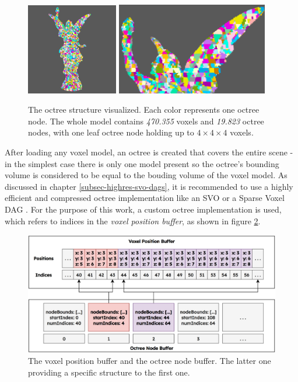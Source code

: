 \begin{figure}[h]
    \centering
    \includegraphics[width=151.5px]{images/graphics/lucy-voxel-octree-viz.jpg}
    \includegraphics[width=250px]{images/graphics/lucy-voxel-octree-viz-2.jpg}
    \caption{The octree structure visualized. Each color represents one octree node. The whole model contains 
    \emph{470.355} voxels and \emph{19.823} octree nodes, with one leaf octree node holding up to \begin{math} 4 \times 4 \times 4 \end{math}
    voxels.}
    \label{fig:voxel-octree-viz}
\end{figure}

\noindent
After loading any voxel model, an octree is created that covers the entire scene - in the simplest case there is 
only one model present so the octree's bounding volume is considered to be equal to the bouding volume of the voxel 
model. As discussed in chapter \ref{subsec-highres-svo-dags}, it is recommended to use a highly efficient and 
compressed octree implementation like an \ac{SVO} or a Sparse Voxel \ac{DAG} \cite{Kampe2013}. For the purpose of 
this work, a custom octree implementation is used, which refers to indices in the \emph{voxel position buffer}, 
as shown in figure \ref{fig:voxelpos-octreenode-buffer}.\\

\begin{figure}[h]
    \centering
    \includegraphics[width=\linewidth]{images/graphics/voxelpos-octreenode-buffer.jpg}
    \caption{The voxel position buffer and the octree node buffer. The latter one providing a 
    specific structure to the first one.}
    \label{fig:voxelpos-octreenode-buffer}
\end{figure}

